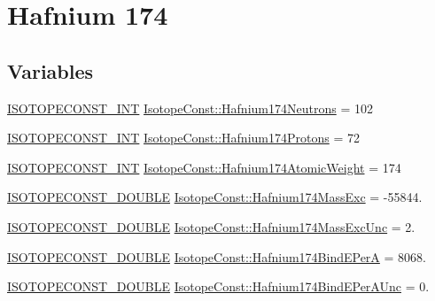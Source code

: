 \hypertarget{group___isotope_const-_hafnium-_hf174}{}\section{Hafnium 174}
\label{group___isotope_const-_hafnium-_hf174}
\subsection*{Variables}
\begin{DoxyCompactItemize}
\item 
\mbox{\hyperlink{group___isotope_const-_macros_ga5f18360b3e99483a35c32d789e62621c}{I\+S\+O\+T\+O\+P\+E\+C\+O\+N\+S\+T\+\_\+\+I\+NT}} \mbox{\hyperlink{group___isotope_const-_hafnium-_hf174_gaf00ef3cbf82d8cfc018cbeca94a2fbb2}{Isotope\+Const\+::\+Hafnium174\+Neutrons}} = 102
\item 
\mbox{\hyperlink{group___isotope_const-_macros_ga5f18360b3e99483a35c32d789e62621c}{I\+S\+O\+T\+O\+P\+E\+C\+O\+N\+S\+T\+\_\+\+I\+NT}} \mbox{\hyperlink{group___isotope_const-_hafnium-_hf174_ga96aa2fb81440ae661451d872b6b5b8d5}{Isotope\+Const\+::\+Hafnium174\+Protons}} = 72
\item 
\mbox{\hyperlink{group___isotope_const-_macros_ga5f18360b3e99483a35c32d789e62621c}{I\+S\+O\+T\+O\+P\+E\+C\+O\+N\+S\+T\+\_\+\+I\+NT}} \mbox{\hyperlink{group___isotope_const-_hafnium-_hf174_ga5dcbbe565525ea6746db3c388cdd63f9}{Isotope\+Const\+::\+Hafnium174\+Atomic\+Weight}} = 174
\item 
\mbox{\hyperlink{group___isotope_const-_macros_ga8f45a7272ce02c0b4c65c44636ed719a}{I\+S\+O\+T\+O\+P\+E\+C\+O\+N\+S\+T\+\_\+\+D\+O\+U\+B\+LE}} \mbox{\hyperlink{group___isotope_const-_hafnium-_hf174_ga39241f3f01120e096b8ec5ea9c74ca69}{Isotope\+Const\+::\+Hafnium174\+Mass\+Exc}} = -\/55844.
\item 
\mbox{\hyperlink{group___isotope_const-_macros_ga8f45a7272ce02c0b4c65c44636ed719a}{I\+S\+O\+T\+O\+P\+E\+C\+O\+N\+S\+T\+\_\+\+D\+O\+U\+B\+LE}} \mbox{\hyperlink{group___isotope_const-_hafnium-_hf174_gaaf8a732ea00ad16e5338df367f07bf1b}{Isotope\+Const\+::\+Hafnium174\+Mass\+Exc\+Unc}} = 2.
\item 
\mbox{\hyperlink{group___isotope_const-_macros_ga8f45a7272ce02c0b4c65c44636ed719a}{I\+S\+O\+T\+O\+P\+E\+C\+O\+N\+S\+T\+\_\+\+D\+O\+U\+B\+LE}} \mbox{\hyperlink{group___isotope_const-_hafnium-_hf174_gabe8579e0d9b9b3f04ca498783c3147bf}{Isotope\+Const\+::\+Hafnium174\+Bind\+E\+PerA}} = 8068.
\item 
\mbox{\hyperlink{group___isotope_const-_macros_ga8f45a7272ce02c0b4c65c44636ed719a}{I\+S\+O\+T\+O\+P\+E\+C\+O\+N\+S\+T\+\_\+\+D\+O\+U\+B\+LE}} \mbox{\hyperlink{group___isotope_const-_hafnium-_hf174_gaefaf9d9a6623ee80b4628fa756ca224b}{Isotope\+Const\+::\+Hafnium174\+Bind\+E\+Per\+A\+Unc}} = 0.

\end{DoxyCompactItemize}
